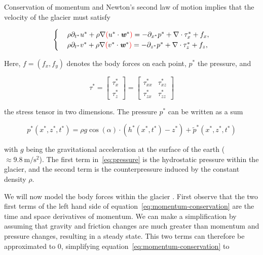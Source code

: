 Conservation of momentum and Newton's second law of motion implies that the velocity of the glacier must satisfy

\begin{equation} \label{eq:momentum-conservation}
  \begin{cases}
    &\rho \partial_{t^*} u^* + \rho \nabla \textcolor{red}{(}u^* \cdot \boldsymbol{\mathit{w}}^*\textcolor{red}{)} = -\partial_{x^*} p^* + \nabla \cdot \tau_x^* + f_x, \\
    &\rho \partial_{t^*} v^* + \rho \nabla \textcolor{red}{(} v^* \cdot \boldsymbol{\mathit{w}}^*\textcolor{red}{)} = -\partial_{z^*} p^* + \nabla \cdot \tau_z^* + f_z,
  \end{cases}
\end{equation}


Here, $f = (f_x, f_y)$ denotes the body forces on each point, $p^*$ the pressure, and

\begin{equation}
  \tau^* = \begin{bmatrix} \tau_x^* \\ \tau_z^* \end{bmatrix} = \begin{bmatrix} \tau_{xx}^* & \tau_{xz}^* \\ \tau_{zx}^* & \tau_{zz}^* \end{bmatrix}
\end{equation}

the stress tensor in two dimensions. The pressure $p^*$ can be written as a sum

\begin{equation} \label{eq:pressure}
  p^*(x^*, z^*, t^*) = \rho g \cos(\alpha) \cdot (h^*(x^*, t^*) - z^*) + \tilde{p}^*(x^*, z^*, t^*)
\end{equation}

with $g$ being the gravitational acceleration at the surface of the earth ($\approx \SI{9.8}{\meter\per\square\second}$). The first term in~\eqref{eq:pressure} is the hydrostatic pressure within the glacier, and the second term is the counterpressure induced by the constant density $\rho$.

We will now model the body forces within the glacier . First observe that the two first terms of the left hand side of equation~\eqref{eq:momentum-conservation} are the time and space derivatives of momentum.
We can make a simplification by assuming that gravity and friction changes are much greater than momentum and pressure changes, resulting in a steady state. This two terms can therefore be approximated to $0$, simplifying equation~\eqref{eq:momentum-conservation} to 

